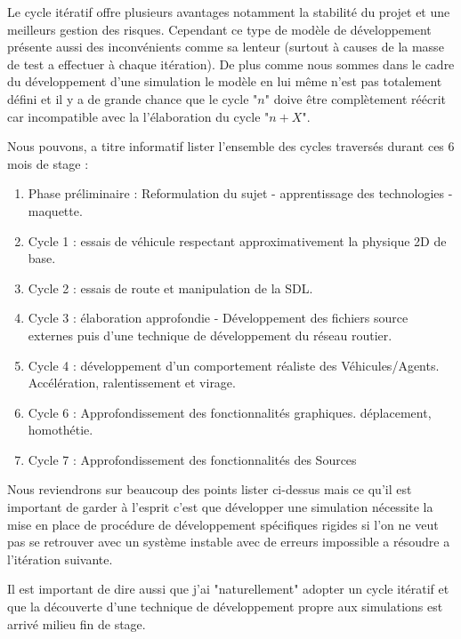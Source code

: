 \documentclass[a4paper,11pt]{article}
\begin{document}
Le cycle itératif offre plusieurs avantages notamment la stabilité du projet et une meilleurs gestion des risques. Cependant ce type de modèle de développement présente aussi des inconvénients comme sa lenteur (surtout à causes de la masse de test a effectuer à chaque itération). De plus comme nous sommes dans le cadre du développement d'une simulation le modèle en lui même n'est pas totalement défini et il y a de grande chance que le cycle "$n$" doive être complètement réécrit car incompatible avec la l'élaboration du cycle "$n + X$".

Nous pouvons, a titre informatif lister l'ensemble des cycles traversés durant ces 6 mois de stage : 

\begin{enumerate}[label=-]
\item 
Phase préliminaire : Reformulation du sujet - apprentissage des technologies - maquette.

\item 
Cycle 1 : essais de véhicule respectant approximativement la physique 2D de base.

\item 
Cycle 2 : essais de route et manipulation de la SDL.

\item 
Cycle 3 : élaboration approfondie - Développement des fichiers source externes puis d'une technique de développement du réseau routier.
 
\item
Cycle 4 : développement d'un comportement réaliste des Véhicules/Agents. Accélération, ralentissement et virage.

\item
Cycle 6 : Approfondissement des fonctionnalités graphiques. déplacement, homothétie.

\item
Cycle 7 : Approfondissement des fonctionnalités des Sources 

\end{enumerate}

Nous reviendrons sur beaucoup des points lister ci-dessus mais ce qu'il est important de garder à l'esprit c'est que développer une simulation nécessite la mise en place de procédure de développement spécifiques rigides si l'on ne veut pas se retrouver avec un système instable avec de erreurs impossible a résoudre a l'itération suivante. 

Il est important de dire aussi que j'ai "naturellement" adopter un cycle itératif et que la découverte d'une technique de développement propre aux simulations est arrivé milieu fin de stage.
\end{document}
